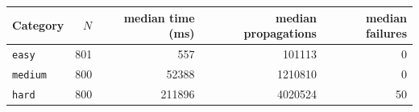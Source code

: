 \begin{tabular}{l r r r r}
\toprule
Category & $N$ & median time (ms) & median propagations & median failures\\
\midrule
\texttt{easy} & 801 & 557 & 101113 & 0\\
\texttt{medium} & 800 & 52388 & 1210810 & 0\\
\texttt{hard} & 800 & 211896 & 4020524 & 50\\
\bottomrule
\end{tabular}
